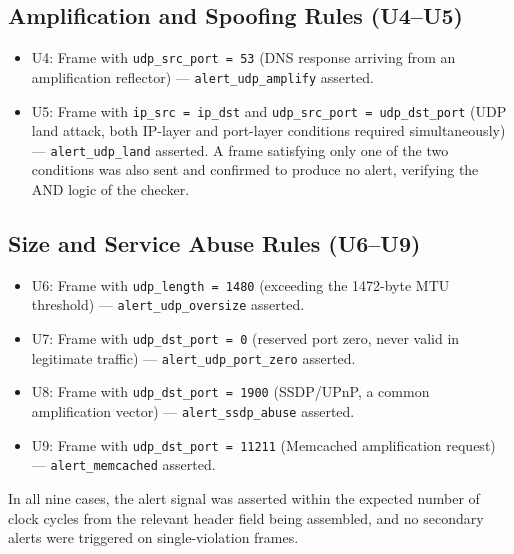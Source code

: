 \documentclass[12pt, a4paper]{report}
\begin{document}
\subsection*{Amplification and Spoofing Rules (U4--U5)}
\begin{itemize}
    \item U4: Frame with \texttt{udp\_src\_port = 53} (DNS response
          arriving from an amplification reflector) ---
          \texttt{alert\_udp\_amplify} asserted.
    \item U5: Frame with \texttt{ip\_src = ip\_dst} and
          \texttt{udp\_src\_port = udp\_dst\_port} (UDP land attack,
          both IP-layer and port-layer conditions required simultaneously) ---
          \texttt{alert\_udp\_land} asserted. A frame satisfying only one
          of the two conditions was also sent and confirmed to produce no
          alert, verifying the AND logic of the checker.
\end{itemize}

\subsection*{Size and Service Abuse Rules (U6--U9)}
\begin{itemize}
    \item U6: Frame with \texttt{udp\_length = 1480} (exceeding the
          1472-byte MTU threshold) ---
          \texttt{alert\_udp\_oversize} asserted.
    \item U7: Frame with \texttt{udp\_dst\_port = 0} (reserved port
          zero, never valid in legitimate traffic) ---
          \texttt{alert\_udp\_port\_zero} asserted.
    \item U8: Frame with \texttt{udp\_dst\_port = 1900} (SSDP/UPnP,
          a common amplification vector) ---
          \texttt{alert\_ssdp\_abuse} asserted.
    \item U9: Frame with \texttt{udp\_dst\_port = 11211} (Memcached
          amplification request) ---
          \texttt{alert\_memcached} asserted.
\end{itemize}

In all nine cases, the alert signal was asserted within the expected
number of clock cycles from the relevant header field being assembled,
and no secondary alerts were triggered on single-violation frames.
%
\end{document}
